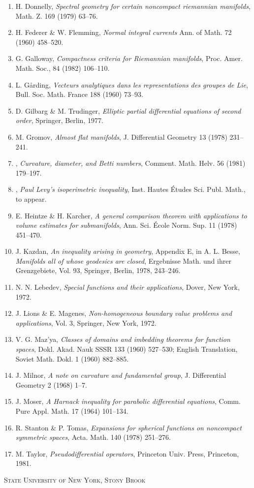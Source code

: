 \begin{enumerate}
\item H. Donnelly, \textit{Spectral geometry for certain noncompact riemannian manifolds}, Math. Z. 169 (1979) 63--76.
\item H. Federer \& W. Flemming, \textit{Normal integral currents} Ann. of Math. 72 (1960) 458--520.
\item G. Galloway, \textit{Compactness criteria for Riemannian manifolds}, Proc. Amer. Math. Soc., 84 (1982) 106--110.
\item L. G\aa rding, \textit{Vecteurs analytiques dans les representations des groupes de Lie}, Bull. Soc. Math. France 188 (1960) 73--93.
\item D. Gilbarg \& M. Trudinger, \textit{Elliptic partial differential equations of second order}, Springer, Berlin, 1977.
\item M. Gromov, \textit{Almost flat manifolds}, J. Differential Geometry 13 (1978) 231--241.
\item \underline{\hspace{2em}}, \textit{Curvature, diameter, and Betti numbers}, Comment. Math. Helv. 56 (1981) 179--197.
\item \underline{\hspace{2em}}, \textit{Paul Levy's isoperimetric inequality}, Inst. Hautes \'{E}tudes Sci. Publ. Math., to appear.
\item E. Heintze \& H. Karcher, \textit{A general comparison theorem with applications to volume estimates for submanifolds}, Ann. Sci. \'{E}cole Norm. Sup. 11 (1978) 451--470.
\item J. Kazdan, \textit{An inequality arising in geometry}, Appendix E, in A. L. Besse, \textit{Manifolds all of whose geodesics are closed}, Ergebnisse Math. und ihrer Grenzgebiete, Vol. 93, Springer, Berlin, 1978, 243--246.
\item N. N. Lebedev, \textit{Special functions and their applications}, Dover, New York, 1972.
\item J. Lions \& E. Magenes, \textit{Non-homogeneous boundary value problems and applications}, Vol. 3, Springer, New York, 1972.
\item V. G. Maz'ya, \textit{Classes of domains and imbedding theorems for function spaces}, Dokl. Akad. Nauk SSSR 133 (1960) 527--530; English Translation, Soviet Math. Dokl. 1 (1960) 882--885.
\item J. Milnor, \textit{A note on curvature and fundamental group}, J. Differential Geometry 2 (1968) 1--7.
\item J. Moser, \textit{A Harnack inequality for parabolic differential equations}, Comm. Pure Appl. Math. 17 (1964) 101--134.
\item R. Stanton \& P. Tomas, \textit{Expansions for spherical functions on noncompact symmetric spaces}, Acta. Math. 140 (1978) 251--276.
\item M. Taylor, \textit{Pseudodifferential operators}, Princeton Univ. Press, Princeton, 1981.
\end{enumerate}

\begin{center}
\textsc{State University of New York, Stony Brook}
\end{center}
